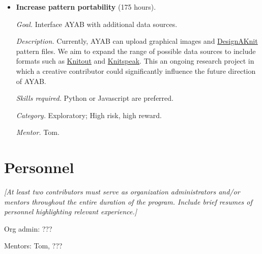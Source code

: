 \documentclass{article}
\begin{document}
\begin{itemize}
\textit{Goal.} Reconfigure the internal representation of the AYAB software to allow different stitch types, and change the graphical output to show stitch symbols in the pattern image.

\textit{Description.} AYAB currently implements various different methods for colorwork knitting, but does not allow variations in texture. Allowing different kinds of stitch -- first and foremost Purl stitches, but possibly also increases, decreases, and cables -- would increase the range of designs that can be created and enable AYAB users to make better use of the capabilities of their knitting machines.

\textit{Skills required.} Python or Javascript are preferred.

\textit{Category.} High risk, high reward.

\textit{Mentor.} Tom.


\item \textbf{Increase pattern portability} (175 hours). 

\textit{Goal.} Interface AYAB with additional data sources.

\textit{Description.} Currently, AYAB can upload graphical images and \href{https://www.softbyte.co.uk/designaknit9.htm}{DesignAKnit} pattern files. We aim to expand the range of possible data sources to include formats such as \href{https://textiles-lab.github.io/knitout/knitout.html}{Knitout} and \href{https://stitch-maps.com/about/knitspeak/}{Knitspeak}. This an ongoing research project in which a creative contributor could significantly influence the future direction of AYAB.

\textit{Skills required.} Python or Javascript are preferred.

\textit{Category.} Exploratory; High risk, high reward.

\textit{Mentor.} Tom.
\end{itemize}


\section{Personnel}

{\itshape 
[At least two contributors must serve as organization administrators and/or mentors throughout the entire duration of the program. Include brief resumes of personnel highlighting relevant experience.]
}
\newline

\begin{flushleft}
Org admin: ???
\newline

Mentors: Tom, ???
\end{flushleft}
\end{document}
